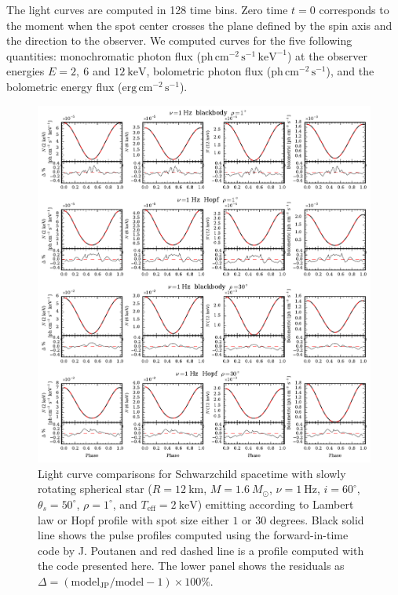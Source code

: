 \documentclass[iop, usenatbib]{emulateapj}
\newcommand{\Msun}{\ensuremath{M_{\odot}}}
\begin{document}
The light curves are computed in 128 time bins.  Zero time $t = 0$ corresponds to the moment when the spot center crosses the plane defined by the spin axis and the direction to the observer.  
We computed curves for the five following quantities: monochromatic photon flux ($\mathrm{ph}\,\mathrm{cm}^{-2}\,\mathrm{s}^{-1}\,\mathrm{keV}^{-1}$) at the observer energies $E = 2,~6$ and $12~\mathrm{keV}$, bolometric photon flux ($\mathrm{ph}\,\mathrm{cm}^{-2}\,\mathrm{s}^{-1}$), and the bolometric energy flux ($\mathrm{erg}\,\mathrm{cm}^{-2}\,\mathrm{s}^{-1}$).


\begin{figure}
\centering
\includegraphics[width=18cm]{figs/fig2a.pdf}
\caption{\label{fig:sch_comp1}
  Light curve comparisons for Schwarzchild spacetime with slowly rotating spherical star ($R = 12~\mathrm{km}$, $M = 1.6~\Msun$, $\nu = 1~\mathrm{Hz}$, $i = 60^{\circ}$, $\theta_s = 50^{\circ}$, $\rho = 1^{\circ}$, and $T_{\mathrm{eff}} = 2~\mathrm{keV}$) emitting according to Lambert law or Hopf profile with spot size either $1$ or $30$ degrees.
  Black solid line shows the pulse profiles computed using the forward-in-time code by J. Poutanen and red dashed line is a profile computed with the code presented here.
  The lower panel shows the residuals as $\Delta = (\mathrm{model_{JP}}/\mathrm{model} -1) \times 100\%$.
}
\end{figure}
\end{document}
